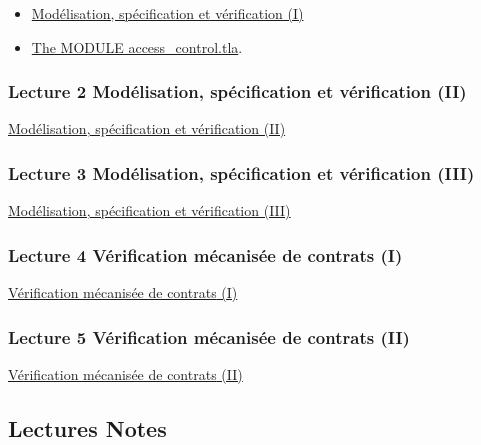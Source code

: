 \documentclass[ 12pt]{article}
\begin{document}
\begin{itemize}
\item
  \href{http://mery54.github.io/teaching/movex/lecturesnotes/movexlecture1.pdf}{Mod\'elisation,
    sp\'ecification et v\'erification (I)}
\item
  \href{http://mery54.github.io/teaching/movex/tlafolder/access_control.tla}{The
    MODULE access\_control.tla}.  
 
\end{itemize}


  
\subsubsection{Lecture 2 {Mod\'elisation,      sp\'ecification et v\'erification} (II)}
  
  \href{http://mery54.github.io/teaching/movex/lecturesnotes/movexlecture2.pdf}{Mod\'elisation,     sp\'ecification et v\'erification (II)}


  \subsubsection{Lecture 3 {Mod\'elisation,      sp\'ecification et v\'erification} (III)}
  
  \href{http://mery54.github.io/teaching/movex/lecturesnotes/movexlecture3.pdf}{Mod\'elisation,     sp\'ecification et v\'erification (III)}


  
  \subsubsection{Lecture 4 {Vérification  mécanisée de contrats} (I)}
  
\href{http://mery54.github.io/teaching/movex/lecturesnotes/movexlecture4.pdf}{{Vérification  mécanisée de contrats} (I)}



  \subsubsection{Lecture 5 {Vérification  mécanisée de contrats} (II)}
  
\href{http://mery54.github.io/teaching/movex/lecturesnotes/movexlecture5.pdf}{{Vérification  mécanisée de contrats} (II)}



  

  \subsection{Lectures Notes}
\end{document}
